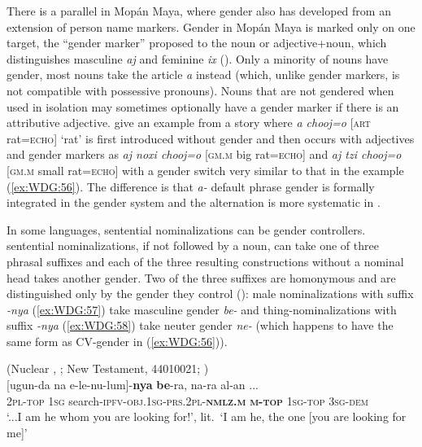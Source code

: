 \documentclass[output=collectionpaper]{langsci/langscibook}
\begin{document}
There is a parallel in Mopán Maya, where gender also has developed from an extension of person name markers. Gender in Mopán Maya is marked only on one target, the ``gender marker'' proposed to the noun or adjective+noun, which distinguishes masculine \textit{aj} and feminine \textit{ix} (\citealt{Contini-Morava2018}). Only a minority of nouns have gender, most nouns take the article \textit{a} instead (which, unlike gender markers, is not compatible with possessive pronouns). Nouns that are not gendered when used in isolation may sometimes optionally have a gender marker if there is an attributive adjective. \cite[138]{Contini-Morava2018} give an example from a story where \textit{a ch\textquotesingle{}o\textquotesingle{}oj=o} [\textsc{art} rat=\textsc{echo}] `rat' is first introduced without gender and then occurs with adjectives and gender markers as \textit{aj noxi\textquotesingle{}  ch\textquotesingle{}o\textquotesingle{}oj=o} [\textsc{gm.m} big rat=\textsc{echo}] and \textit{aj tz\textquotesingle{}i\textquotesingle{} ch\textquotesingle{}o\textquotesingle{}oj=o} [\textsc{gm.m} small rat=\textsc{echo}] with a gender switch very similar to that in the  example (\ref{ex:WDG:56}). The difference is that  \textit{a-} default phrase gender is formally integrated in the gender system and the alternation is more systematic in .

In some languages, sentential nominalizations can be gender controllers.  sentential nominalizations, if not followed by a noun, can take one of three phrasal suffixes and each of the three resulting constructions without a nominal head takes another gender. Two of the three suffixes are homonymous and are distinguished only by the gender they control (\citealt{Waelchli2018}): male nominalizations with suffix \textit{-nya} (\ref{ex:WDG:57}) take masculine gender \textit{be-} and thing-nominalizations with suffix \textit{-nya} (\ref{ex:WDG:58}) take neuter gender \textit{ne-} (which happens to have the same form as CV-gender in (\ref{ex:WDG:56})).

\ea\label{ex:WDG:57}
 (Nuclear , ; New Testament, 44010021; \citealt[80]{Waelchli2018})\\
 [ugun-da	na	e-le-nu-lum]-\textbf{nya}	\textbf{be}-ra,	na-ra	al-an ...\\
{} \textsc{2pl-top}	\textsc{1sg}\footnotemark{} 	search-\textsc{ipfv-obj.1sg-prs.2pl-\textbf{nmlz.m}}	\textbf{\textsc{m-top}}	\textsc{1sg-top}	\textsc{3sg-dem} {}\\
\glt `...I am he whom you are looking for!', lit.\ `I am he, the one [you are looking for me]'\\
\z
%
\end{document}
